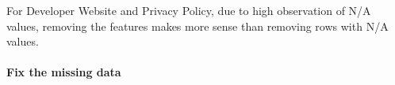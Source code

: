 For Developer Website and Privacy Policy, due to high observation of N/A values, removing the features makes more sense than removing rows with N/A values.

\paragraph{Fix the missing data}
